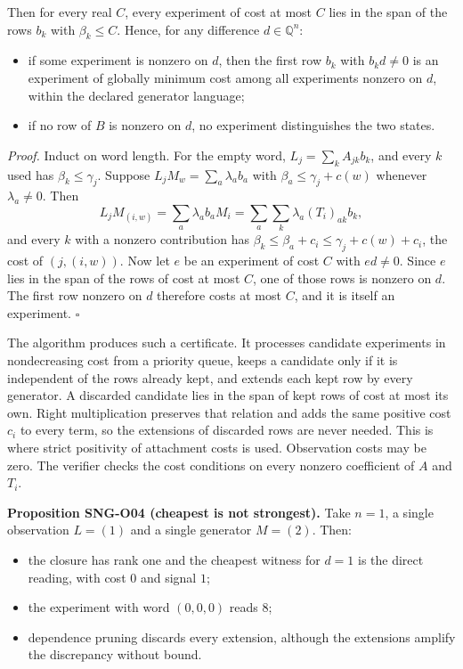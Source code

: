 \documentclass[
  11pt,
  a4paper,
]{report}
\providecommand{\tightlist}{%
  \setlength{\itemsep}{0pt}\setlength{\parskip}{0pt}}
\begin{document}
Then for every real \(C\), every experiment of cost at most \(C\) lies
in the span of the rows \(b_k\) with \(\beta_k\le C\). Hence, for any
difference \(d\in\mathbb Q^n\):

\begin{itemize}
\tightlist
\item
  if some experiment is nonzero on \(d\), then the first row \(b_k\)
  with \(b_kd\ne0\) is an experiment of globally minimum cost among all
  experiments nonzero on \(d\), within the declared generator language;
\item
  if no row of \(B\) is nonzero on \(d\), no experiment distinguishes
  the two states.
\end{itemize}

\emph{Proof.} Induct on word length. For the empty word,
\(L_j=\sum_kA_{jk}b_k\), and every \(k\) used has
\(\beta_k\le\gamma_j\). Suppose \(L_jM_w=\sum_a\lambda_ab_a\) with
\(\beta_a\le\gamma_j+c(w)\) whenever \(\lambda_a\ne0\). Then \[
L_jM_{(i,w)}=\sum_a\lambda_ab_aM_i=\sum_a\sum_k\lambda_a(T_i)_{ak}b_k ,
\] and every \(k\) with a nonzero contribution has
\(\beta_k\le\beta_a+c_i\le\gamma_j+c(w)+c_i\), the cost of
\((j,(i,w))\). Now let \(e\) be an experiment of cost \(C\) with
\(ed\ne0\). Since \(e\) lies in the span of the rows of cost at most
\(C\), one of those rows is nonzero on \(d\). The first row nonzero on
\(d\) therefore costs at most \(C\), and it is itself an experiment.
\(\square\)

The algorithm produces such a certificate. It processes candidate
experiments in nondecreasing cost from a priority queue, keeps a
candidate only if it is independent of the rows already kept, and
extends each kept row by every generator. A discarded candidate lies in
the span of kept rows of cost at most its own. Right multiplication
preserves that relation and adds the same positive cost \(c_i\) to every
term, so the extensions of discarded rows are never needed. This is
where strict positivity of attachment costs is used. Observation costs
may be zero. The verifier checks the cost conditions on every nonzero
coefficient of \(A\) and \(T_i\).

\textbf{Proposition SNG-O04 (cheapest is not strongest).} Take \(n=1\),
a single observation \(L=(1)\) and a single generator \(M=(2)\). Then:

\begin{itemize}
\tightlist
\item
  the closure has rank one and the cheapest witness for \(d=1\) is the
  direct reading, with cost \(0\) and signal \(1\);
\item
  the experiment with word \((0,0,0)\) reads \(8\);
\item
  dependence pruning discards every extension, although the extensions
  amplify the discrepancy without bound.
\end{itemize}
\end{document}
